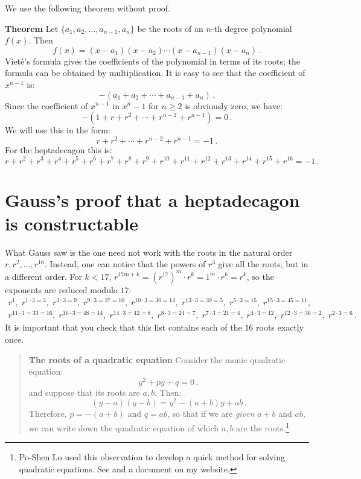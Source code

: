 \documentclass[11pt,a4paper]{article}
\newenvironment{form}[1]{%
\begin{displaymath}%
\renewcommand{\arraystretch}{#1}%
\begin{array}{lcl}}%
{\end{array}%
\end{displaymath}%
}
\begin{document}
We use the following theorem without proof.

\textbf{Theorem} Let $\{a_1,a_2,\ldots,a_{n-1},a_n\}$ be the roots of an $n$-th degree polynomial $f(x)$. Then 
\[
f(x) =(x-a_1) (x-a_2)\cdots (x-a_{n-1})(x-a_n)\,.
\]
Viet\'{e}'s formula \cite[p. 28]{jorg} gives the coefficients of the polynomial in terms of its roots; the formula can be obtained by multiplication. It is easy to see that the coefficient of $x^{n-1}$ is:
\[
-(a_1+a_2+\cdots+a_{n-1}+a_n)\,.
\]
Since the coefficient of $x^{n-1}$ in $x^n-1$ for $n\geq 2$ is obviously zero, we have:
\[
-(1+r+r^2+\cdots + r^{n-2}+r^{n-1})=0\,.
\]
We will use this in the form:
\[
r+r^2+\cdots + r^{n-2}+r^{n-1}=-1\,.
\]
For the heptadecagon this is:
\[
r+r^2+r^3+r^4+r^5+r^6+r^7+r^8+r^9+r^{10}+r^{11}+r^{12}+r^{13}+r^{14} + r^{15}+r^{16}=-1\,.
\]


\section{Gauss's proof that a heptadecagon is constructable}\label{s.gauss}

What Gauss saw is the one need not work with the roots in the natural order $r,r^2,\ldots,r^{16}$. Instead, one can notice that the powers of $r^3$ give all the roots, but in a different order. For $k<17$, $r^{17m+k}=(r^{17})^m\cdot r^k=1^m\cdot r^k=r^k$, so the exponents are reduced modulo $17$:
\begin{form}{1.2}
r^1, \;r^{1\cdot 3 =3},\; r^{3\cdot 3=9},\; r^{9\cdot 3=27=10},\; r^{10\cdot 3=30=13},\; r^{13\cdot 3=39=5},\; r^{5\cdot 3=15},\; r^{15\cdot 3=45=11},&&\\
r^{11\cdot 3 =33=16}, \;r^{16\cdot 3=48=14},\; r^{14\cdot 3=42=8},\; r^{8\cdot 3=24=7},\;r^{7\cdot 3=21=4},\; r^{4\cdot 3=12},\; r^{12\cdot 3=36=2},\; r^{2\cdot 3=6}\,.&&
\end{form}
It is important that you check that this list contains each of the $16$ roots exactly once.

\vspace{-1ex}
\begin{quote}
\textbf{The roots of a quadratic equation} Consider the monic quadratic equation:
\[
y^2+py+q=0\,,
\]
and suppose that its roots are $a,b$. Then:
\[
(y-a)(y-b)=y^2 - (a+b)y + ab\,.
\]
Therefore, $p=-(a+b)$ and $q=ab$, so that if we are \emph{given} $a+b$ and $ab$, we can write down the quadratic equation of which $a,b$ are the roots.\footnote{Po-Shen Lo used this observation to develop a quick method for solving quadratic equations. See \cite{lo}
and a document on my website.}
\end{quote}
\vspace{-1ex}
\end{document}
